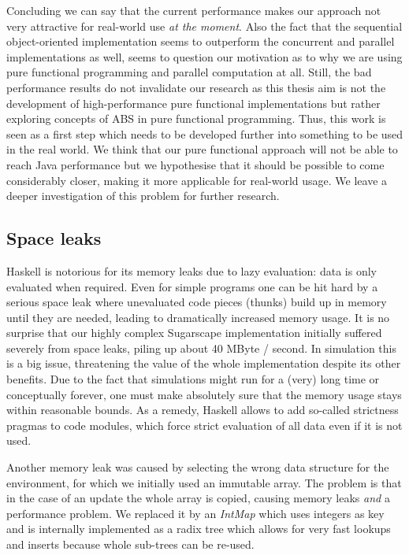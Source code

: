 Concluding we can say that the current performance makes our approach not very attractive for real-world use \textit{at the moment}. Also the fact that the sequential object-oriented implementation seems to outperform the concurrent and parallel implementations as well, seems to question our motivation as to why we are using pure functional programming and parallel computation at all. Still, the bad performance results do not invalidate our research as this thesis aim is not the development of high-performance pure functional implementations but rather exploring concepts of ABS in pure functional programming. Thus, this work is seen as a first step which needs to be developed further into something to be used in the real world. We think that our pure functional approach will not be able to reach Java performance but we hypothesise that it should be possible to come considerably closer, making it more applicable for real-world usage. We leave a deeper investigation of this problem for further research.

\subsection{Space leaks}
Haskell is notorious for its memory leaks due to lazy evaluation: data is only evaluated when required. Even for simple programs one can be hit hard by a serious space leak where unevaluated code pieces (thunks) build up in memory until they are needed, leading to dramatically increased memory usage. It is no surprise that our highly complex Sugarscape implementation initially suffered severely from space leaks, piling up about 40 MByte / second. In simulation this is a big issue, threatening the value of the whole implementation despite its other benefits. Due to the fact that simulations might run for a (very) long time or conceptually forever, one must make absolutely sure that the memory usage stays within reasonable bounds. As a remedy, Haskell allows to add so-called strictness pragmas to code modules, which force strict evaluation of all data even if it is not used. %

Another memory leak was caused by selecting the wrong data structure for the environment, for which we initially used an immutable array. The problem is that in the case of an update the whole array is copied, causing memory leaks \textit{and} a performance problem. We replaced it by an \textit{IntMap} which uses integers as key and is internally implemented as a radix tree which allows for very fast lookups and inserts because whole sub-trees can be re-used.

